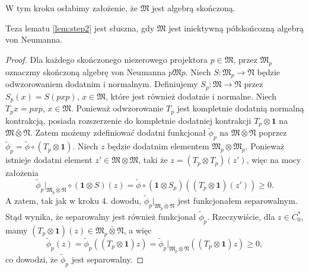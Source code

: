 W tym kroku osłabimy założenie, że $\mathfrak{M}$ jest algebrą skończoną.
\begin{Lemma}
Teza lematu \ref{lem:step2} jest słuszna, gdy
$\mathfrak{M}$ jest iniektywną półskońcozną algebrą von Neumanna.
\end{Lemma}
\begin{proof}
Dla każdego skończonego niezerowego projektora $p \in \mathfrak{M}$,
przez $\mathfrak{M}_{p}$ oznaczmy skończoną algebrę von Neumanna
$p \mathfrak{M} p$.
Niech $S : \mathfrak{M}_{p} \rightarrow \mathfrak{N}$ będzie odwzorowaniem
dodatnim i normalnym.
Definiujemy $S_{p} : \mathfrak{M} \rightarrow \mathfrak{N}$
przez $S_{p}(x) = S(pxp)$, $x \in \mathfrak{M}$,
które jest również dodatnie i normalne.
Niech $T_{p}x = p x p$, $x \in \mathfrak{M}$.
Ponieważ odwzorowanie $T_{p}$ jest kompletnie dodatnią normalną kontrakcją,
posiada rozszerzenie do kompletnie dodatniej kontrakcji
$T_{p} \otimes \mathbf{1}$ na $\mathfrak{M} \bar{\otimes} \mathfrak{N}$.
Zatem możemy zdefiniować dodatni funkcjonał $\tilde{\phi}_{p}$ na
$\mathfrak{M} \bar{\otimes} \mathfrak{N}$ poprzez
$\tilde{\phi}_{p} = \tilde{\phi} \circ (T_{p} \otimes \mathbf{1})$.
Niech $z$ będzie dodatnim elementem $\mathfrak{M}_{p} \otimes \mathfrak{M}_{p}$.
Ponieważ istnieje dodatni element $z' \in \mathfrak{M} \otimes \mathfrak{M}$,
taki że $z = (T_{p} \otimes T_{p})(z')$, więc na mocy założenia
\begin{equation}
\tilde{\phi}_{p} \big|_{\mathfrak{M}_{p} \bar{\otimes} \mathfrak{N}}
\circ (\mathbf{1} \otimes S)(z) =
\tilde{\phi} \circ (\mathbf{1} \otimes S_{p})
\left( (T_{p} \otimes \mathbf{1})(z') \right ) \geq 0.
\end{equation}
A zatem, tak jak w kroku 4. dowodu,
$\tilde{\phi}_{p} \big|_{\mathfrak{M}_{p} \bar{\otimes} \mathfrak{N}}$
jest funkcjonałem separowalnym.
Stąd wynika, że separowalny jest również funkcjonał $\tilde{\phi}_{p}$.
Rzeczywiście, dla $z\in C_{0}^{*}$, mamy
$(T_{p} \otimes \mathbf{1})(z) \in
\mathfrak{M}_{p} \bar{\otimes} \mathfrak{N}$, a więc
\begin{equation}
\tilde{\phi}_{p}(z) = \tilde{\phi}_{p}((T_{p} \otimes \mathbf{1}) z) =
\tilde{\phi}_{p} \big|_{\mathfrak{M}_{p} \bar{\otimes} \mathfrak{N}}
((T_{p} \otimes \mathbf{1}) z) \geq 0,
\end{equation}
co dowodzi, że $\tilde{\phi}_{p}$ jest separowalny.


\end{proof}
